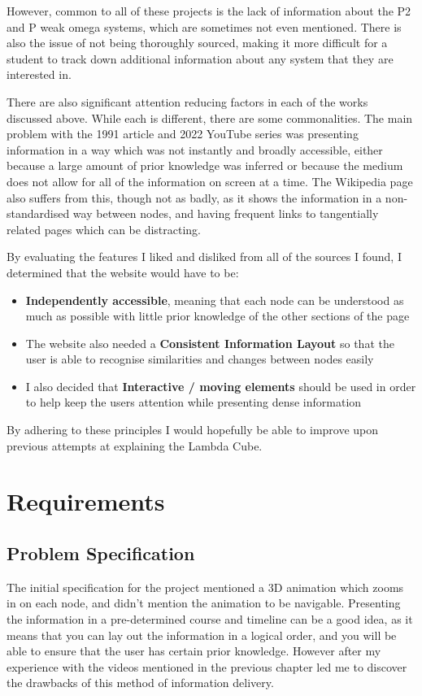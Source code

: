 \documentclass{l4proj}
\begin{document}
However, common to all of these projects is the lack of information about the P2 and P weak omega systems, which are sometimes not even mentioned.  There is also the issue of not being thoroughly sourced, making it more difficult for a student to track down additional information about any system that they are interested in.

There are also significant attention reducing factors in each of the works discussed above.  While each is different, there are some commonalities.  The main problem with the 1991 article and 2022 YouTube series was presenting information in a way which was not instantly and broadly accessible, either because a large amount of prior knowledge was inferred or because the medium does not allow for all of the information on screen at a time.  The Wikipedia page also suffers from this, though not as badly, as it shows the information in a non-standardised way between nodes, and having frequent links to tangentially related pages which can be distracting.

By evaluating the features I liked and disliked from all of the sources I found, I determined that the website would have to be:

\begin{itemize}
    \item \textbf{Independently accessible}, meaning that each node can be understood as much as possible with little prior knowledge of the other sections of the page

    \item The website also needed a \textbf{Consistent Information Layout} so that the user is able to recognise similarities and changes between nodes easily

    \item I also decided that \textbf{Interactive / moving elements} should be used in order to help keep the users attention while presenting dense information
\end{itemize}

By adhering to these principles I would hopefully be able to improve upon previous attempts at explaining the Lambda Cube.
\chapter{Requirements}

\section{Problem Specification}
The initial specification for the project mentioned a 3D animation which zooms in on each node, and didn't mention the animation to be navigable.  Presenting the information in a pre-determined course and timeline can be a good idea, as it means that you can lay out the information in a logical order, and you will be able to ensure that the user has certain prior knowledge.  However after my experience with the videos mentioned in the previous chapter led me to discover the drawbacks of this method of information delivery.
\end{document}
